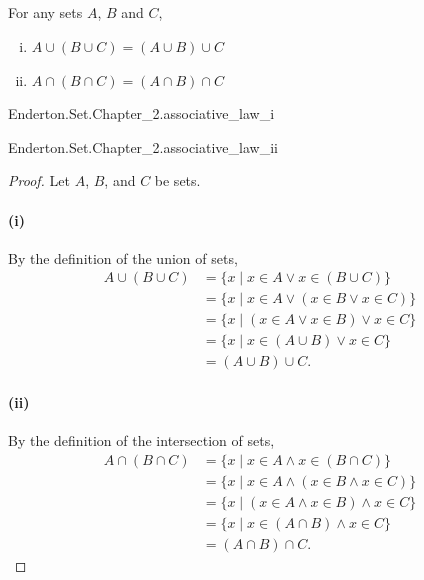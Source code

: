 \documentclass{report}
\begin{document}
\subsection{}%

  For any sets $A$, $B$ and $C$,
    \begin{enumerate}[(i)]
      \item $A \cup (B \cup C) = (A \cup B) \cup C$
      \item $A \cap (B \cap C) = (A \cap B) \cap C$
    \end{enumerate}

    {Enderton.Set.Chapter\_2.associative\_law\_i}


    {Enderton.Set.Chapter\_2.associative\_law\_ii}


  \begin{proof}

    Let $A$, $B$, and $C$ be sets.

    \paragraph{(i)}%

      By the definition of the union of sets,
        \begin{align*}
          A \cup (B \cup C)
            & = \{ x \mid x \in A \lor x \in (B \cup C) \} \\
            & = \{ x \mid x \in A \lor (x \in B \lor x \in C) \} \\
            & = \{ x \mid (x \in A \lor x \in B) \lor x \in C \} \\
            & = \{ x \mid x \in (A \cup B) \lor x \in C \} \\
            & = (A \cup B) \cup C.
        \end{align*}

    \paragraph{(ii)}%

      By the definition of the intersection of sets,
        \begin{align*}
          A \cap (B \cap C)
            & = \{ x \mid x \in A \land x \in (B \cap C) \} \\
            & = \{ x \mid x \in A \land (x \in B \land x \in C) \} \\
            & = \{ x \mid (x \in A \land x \in B) \land x \in C \} \\
            & = \{ x \mid x \in (A \cap B) \land x \in C \} \\
            & = (A \cap B) \cap C.
        \end{align*}

  \end{proof}
\end{document}
